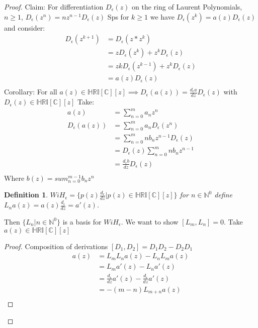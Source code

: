 \documentclass[10pt, oneside]{article}
\newcommand{\C}{\mathbb{C}}
\newcommand{\N}{\mathbb{N}}
\newcommand{\HRI}{\mathbb{HRI}}
\newtheorem{defn}{Definition}
\begin{document}
\begin{proof}
    Claim: For differentiation $D_{\epsilon} (z)$ on the ring of Laurent Polynomials, $n \geq 1$, $D_{\epsilon} (z^{n})=nz^{n-1}D_{\epsilon}(z)$
    Sps for $k \geq 1$ we have $D_{\epsilon} (z^{k})=a(z) D_{\epsilon}(z)$ and consider:
    \begin{align*}
        D_{\epsilon}(z^{k+1}) &= D_{\epsilon}(z*z^{k})\\
        &= z D_{\epsilon}(z^k)+z^k D_{\epsilon}(z) \\
        &= z k D_{\epsilon}(z^{k-1}) + z^k D_{\epsilon}(z) \\
        &= a(z) D_{\epsilon}(z) \\
    \end{align*}
    Corollary: For all $a(z) \in \HRI[\C][z] \implies D_{\epsilon}(a(z)) = \frac{d_{\epsilon}a}{dz}D_{\epsilon}(z)$ with $D_{\epsilon}(z) \in \HRI[\C][z]$
    Take:
    \begin{align*}
        a(z) &= \sum_{n=0}^{m} a_{n} z^n \\
        D_{\epsilon} (a(z)) &= \sum_{n=0}^{m} a_{n} D_{\epsilon}(z^n) \\
        &= \sum_{n=0}^{m} n b_{n} z^{n-1} D_{\epsilon}(z) \\
        &= D_{\epsilon}(z) \sum_{n=0}^{m} n b_{n} z^{n-1} \\
        &= \frac{d_{\epsilon}b}{dz} D_{\epsilon}(z) \\
    \end{align*}
    Where $b(z) = sum_{n=0}^{m-1} b_{n} z^{n}$
    \begin{defn}
        $WiH_{\epsilon} = \{ p(z) \frac{d_{\epsilon}}{dz} | p(z) \in \HRI[\C][z] \}$ for $n \in \N^{0}$ define $L_{n}a(z) = a(z) \frac{d_{\epsilon}}{dz}=a'(z)$.
    \end{defn}
    Then $\{L_{n} | n \in \N^{0} \}$ is a basis for $WiH_{\epsilon}$. We want to show $[L_{m},L_{n}]=0$. Take $a(z) \in \HRI[\C][z]$
    \begin{proof}
        Composition of derivations $[D_1, D_2]=D_1 D_2 - D_2 D_1$ \cite{Kac1990}
        \begin{align*}
            [L_m, L_n] a(z) &= L_m L_n a(z) - L_n L_m a(z) \\
            &= L_m a'(z) - L_n a'(z)\\
            &=  \frac{d_\epsilon}{dz} a'(z) - \frac{d_{\epsilon}}{dz} a'(z) \\
            &= -(m-n) L_{m+n} a(z)\\
        \end{align*}
    \end{proof} 
\end{proof}
\end{document}
